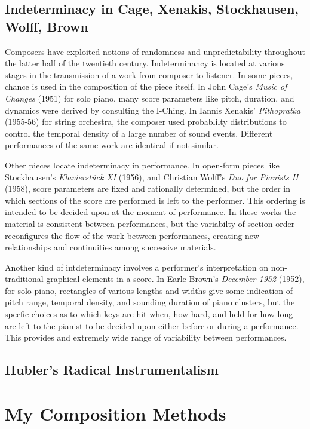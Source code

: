 \documentclass[11pt]{article}
\begin{document}
\subsection{Indeterminacy in Cage, Xenakis, Stockhausen, Wolff, Brown}
Composers have exploited notions of randomness and unpredictability throughout the latter half of the twentieth century. Indeterminancy is located at various stages in the transmission of a work from composer to listener. In some pieces, chance is used in the composition of the piece itself. In John Cage's \textit{Music of Changes} (1951) for solo piano, many score parameters like pitch, duration, and dynamics were derived by consulting the I-Ching. In Iannis Xenakis' \textit{Pithopratka} (1955-56) for string orchestra, the composer used probablilty distributions to control the temporal density of a large number of sound events. Different performances of the same work are identical if not similar.

Other pieces locate indeterminacy in performance. In open-form pieces like Stockhausen's \textit{Klavierstück XI} (1956), and Christian Wolff's \textit {Duo for Pianists II} (1958), score parameters are fixed and rationally determined, but the order in which sections of the score are performed is left to the performer. This ordering is intended to be decided upon at the moment of performance. In these works the material is consistent between performances, but the variabilty of section order reconfigures the flow of the work between performances, creating new relationships and continuities among successive materials.

Another kind of intdeterminacy involves a performer's interpretation on non-traditional graphical elements in a score. In Earle Brown's \textit {December 1952} (1952), for solo piano, rectangles of various lengths and widths give some indication of pitch range, temporal density, and sounding duration of piano clusters, but the specfic choices as to which keys are hit when, how hard, and held for how long are left to the pianist to be decided upon either before or during a performance. This provides and extremely wide range of variability between performances.


\subsection{Hubler's Radical Instrumentalism}



\section{My Composition Methods}
\end{document}
